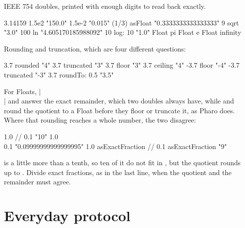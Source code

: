 IEEE 754 doubles, printed with enough digits to read back exactly.

\begin{st}
3.14159
1.5e2                       "150.0"
1.5e-2                      "0.015"
(1/3) asFloat               "0.3333333333333333"
9 sqrt                      "3.0"
100 ln                      "4.605170185988092"
10 log: 10                  "1.0"
Float pi
Float e
Float infinity
\end{st}

Rounding and truncation, which are four different questions:

\begin{st}
3.7 rounded                 "4"
3.7 truncated               "3"
3.7 floor                   "3"
3.7 ceiling                 "4"
-3.7 floor                  "-4"
-3.7 truncated              "-3"
3.7 roundTo: 0.5            "3.5"
\end{st}

For Floats, \ct|\\| and  answer the exact remainder, which two
doubles always have, while \ct{//} and  round the quotient to a
Float before they floor or truncate it, as Pharo does. Where that rounding
reaches a whole number, the two disagree:

\begin{st}
1.0 // 0.1                                  "10"
1.0 \\ 0.1                                  "0.09999999999999995"
1.0 asExactFraction // 0.1 asExactFraction  "9"
\end{st}

 is a little more than a tenth, so ten of it do not fit in
, but the quotient rounds up to . Divide exact fractions,
as in the last line, when the quotient and the remainder must agree.

\section{Everyday protocol}

